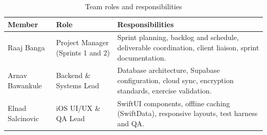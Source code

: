 \documentclass[12pt,letterpaper]{article}
\begin{document}
\begin{table}[H]
\centering
\caption{Team roles and responsibilities}
\label{tab:team}
\begin{tabularx}{\textwidth}{@{}L{3.1cm} L{3.3cm} Y@{}}
\toprule
\textbf{Member} & \textbf{Role} & \textbf{Responsibilities} \\
\midrule
Raaj Banga & Project Manager (Sprints 1 and 2) & Sprint planning, backlog and schedule, deliverable coordination, client liaison, sprint documentation. \\
Arnav Bawankule & Backend \& Systems Lead & Database architecture, Supabase configuration, cloud sync, encryption standards, exercise validation. \\
Elnad Salcinovic & iOS UI/UX \& QA Lead & SwiftUI components, offline caching (SwiftData), responsive layouts, test harness and QA. \\
\bottomrule
\end{tabularx}
\end{table}
\end{document}
